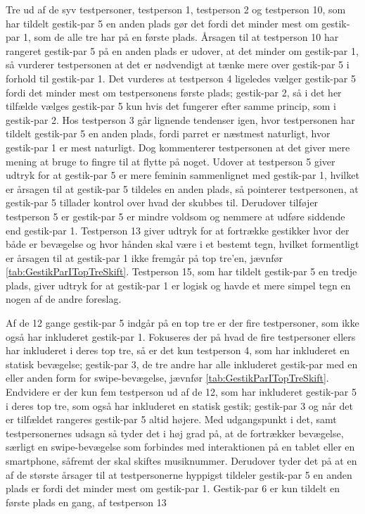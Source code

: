 Tre ud af de syv testpersoner, testperson 1, testperson 2 og testperson 10, som har tildelt gestik-par 5 en anden plads gør det fordi det minder mest om gestik-par 1, som de alle tre har på en første plads. Årsagen til at testperson 10 har rangeret gestik-par 5 på en anden plads er udover, at det minder om gestik-par 1, så vurderer testpersonen at det er nødvendigt at tænke mere over gestik-par 5 i forhold til gestik-par 1. Det vurderes at testperson 4 ligeledes vælger gestik-par 5 fordi det minder mest om testpersonens første plads; gestik-par 2, så i det her tilfælde vælges gestik-par 5 kun hvis det fungerer efter samme princip, som i gestik-par 2. Hos testperson 3 går lignende tendenser igen, hvor testpersonen har tildelt gestik-par 5 en anden plads, fordi parret er næstmest naturligt, hvor gestik-par 1 er mest naturligt. Dog kommenterer testpersonen at det giver mere mening at bruge to fingre til at flytte på noget. Udover at testperson 5 giver udtryk for at gestik-par 5 er mere feminin sammenlignet med gestik-par 1, hvilket er årsagen til at gestik-par 5 tildeles en anden plads, så pointerer testpersonen, at gestik-par 5 tillader kontrol over hvad der skubbes til. Derudover tilføjer testperson 5 er gestik-par 5 er mindre voldsom og nemmere at udføre siddende end gestik-par 1. Testperson 13 giver udtryk for at fortrække gestikker hvor der både er bevægelse og hvor hånden skal være i et bestemt tegn, hvilket formentligt er årsagen til at gestik-par 1 ikke fremgår på top tre'en, jævnfør \autoref{tab:GestikParITopTreSkift}. Testperson 15, som har tildelt gestik-par 5 en tredje plads, giver udtryk for at gestik-par 1 er logisk og havde et mere simpel tegn en nogen af de andre foreslag. 

Af de 12 gange gestik-par 5 indgår på en top tre er der fire testpersoner, som ikke også har inkluderet gestik-par 1. Fokuseres der på hvad de fire testpersoner ellers har inkluderet i deres top tre, så er det kun testperson 4, som har inkluderet en statisk bevægelse; gestik-par 3, de tre andre har alle inkluderet gestik-par med en eller anden form for swipe-bevægelse, jævnfør \autoref{tab:GestikParITopTreSkift}. Endvidere er der kun fem testperson ud af de 12, som har inkluderet gestik-par 5 i deres top tre, som også har inkluderet en statisk gestik; gestik-par 3 og når det er tilfældet rangeres gestik-par 5 altid højere. Med udgangspunkt i det, samt testpersonernes udsagn så tyder det i høj grad på, at de fortrækker bevægelse, særligt en swipe-bevægelse som forbindes med interaktionen på en tablet eller en smartphone, såfremt der skal skiftes musiknummer. Derudover tyder det på at en af de største årsager til at testpersonerne hyppigst tildeler gestik-par 5 en anden plads er fordi det minder mest om gestik-par 1.\blankline
%                
Gestik-par 6 er kun tildelt en første plads en gang, af testperson 13 




